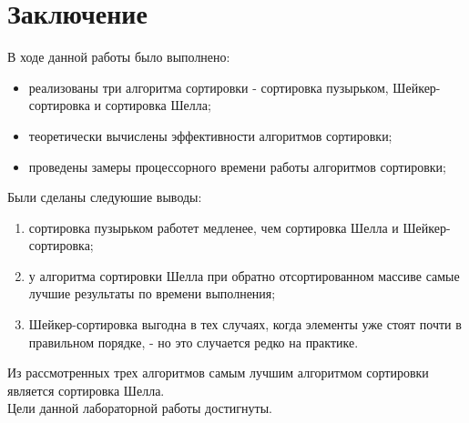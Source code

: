 \documentclass[a4paper]{article}
\begin{document}
\section{Заключение}
В ходе данной работы было выполнено:
\begin{itemize}
	\item реализованы три алгоритма сортировки - сортировка пузырьком, Шейкер-сортировка и сортировка Шелла;
	\item теоретически вычислены эффективности алгоритмов сортировки;
	\item проведены замеры процессорного времени работы алгоритмов сортировки;
\end{itemize}
Были сделаны следуюшие выводы:
\begin{enumerate}
	\item сортировка пузырьком работет медленее, чем сортировка Шелла и Шейкер-сортировка;
	\item у алгоритма сортировки Шелла при обратно отсортированном массиве самые лучшие результаты по времени выполнения;
	\item Шейкер-сортировка выгодна в тех случаях, когда элементы уже стоят почти в правильном порядке, - но это случается редко на практике. \cite{nikvirt}
\end{enumerate}
Из рассмотренных трех алгоритмов самым лучшим алгоритмом сортировки является сортировка Шелла.\\
Цели данной лабораторной работы достигнуты.
\clearpage
\end{document}
